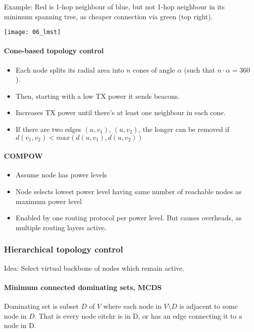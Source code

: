 Example: Red is 1-hop neighbour of blue, but not 1-hop neighbour in its minimum
spanning tree, as cheaper connection via green (top right).

\texttt{[image: 06\_lmst]}

\paragraph{Cone-based topology control}

\begin{itemize}
		\item Each node splits its radial area into $n$ cones of angle $\alpha$
				(such that $n \cdot \alpha = 360$).
		\item Then, starting with a low TX power it sends beacons.
		\item Increases TX power until there's at least one neighbour in each cone.
		\item If there are two edges $(u, v_1)$, $(u, v_2)$, the longer can be
				removed if $d(v_1, v_2) < max(d(u, v_1), d(u, v_2))$
\end{itemize}


\paragraph{COMPOW}

\begin{itemize}
		\item Assume node has power levels
		\item Node selects lowest power level having same number of reachable
				nodes as maximum power level
		\item Enabled by one routing protocol per power level. But causes
				overheads, as multiple routing layers active.
\end{itemize}

\subsubsection{Hierarchical topology control}

Idea: Select virtual backbone of nodes which remain active.

\paragraph{Minimum connected dominating sets, MCDS}

Dominating set is subset $D$ of $V$ where each node in $V \setminus D$ is
adjacent to some node in $D$. That is every node eitehr is in D, or has an edge
connecting it to a node in D.

